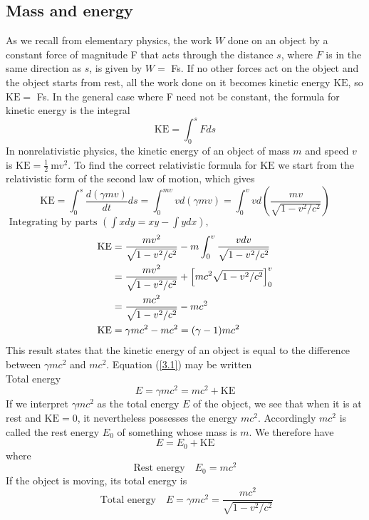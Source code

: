 \subsection{Mass and energy}
As we recall from elementary physics, the work $W$ done on an object by a constant force of magnitude F that acts through the distance $s$, where $F$ is in the same direction as $s$, is given by $W=$ Fs. If no other forces act on the object and the object starts from rest, all the work done on it becomes kinetic energy $\mathrm{KE}$, so $\mathrm{KE}=$ Fs. In the general case where F need not be constant, the formula for kinetic energy is the integral
$$
\mathrm{KE}=\int_{0}^{s} F d s
$$
In nonrelativistic physics, the kinetic energy of an object of mass $m$ and speed $v$ is $\mathrm{KE}=\frac{1}{2} \mathrm{~m} v^{2}$. To find the correct relativistic formula for $\mathrm{KE}$ we start from the relativistic form of the second law of motion, which gives
$$\mathrm{KE}=\int_{0}^{s} \frac{d(\gamma m v)}{d t} d s=\int_{0}^{m v} v d(\gamma m v)=\int_{0}^{v} v d\left(\frac{m v}{\sqrt{1-v^{2} / c^{2}}}\right)$$
$\text { Integrating by parts }\left(\int x d y=x y-\int y d x\right) \text {, }$
\begin{align}
	\mathrm{KE} &=\frac{m v^{2}}{\sqrt{1-v^{2} / c^{2}}}-m \int_{0}^{v} \frac{v d v}{\sqrt{1-v^{2} / c^{2}}} \notag \\
	&=\frac{m v^{2}}{\sqrt{1-v^{2} / c^{2}}}+\left[m c^{2} \sqrt{1-v^{2} / c^{2}}\right]_{0}^{v} \notag \\
	&=\frac{m c^{2}}{\sqrt{1-v^{2} / c^{2}}}-m c^{2}\notag\\
	\mathrm{KE}&=\gamma m c^{2}-m c^{2}=(\gamma-1) m c^{2} \label{3.1}
\end{align}
This result states that the kinetic energy of an object is equal to the difference between $\gamma m c^{2}$ and $m c^{2}$. Equation (\ref{3.1}) may be written\\
Total energy
$$
E=\gamma m c^{2}=m c^{2}+\mathrm{KE}
$$
If we interpret $\gamma m c^{2}$ as the total energy $E$ of the object, we see that when it is at rest and $\mathrm{KE}=0$, it nevertheless possesses the energy $m c^{2}$. Accordingly $m c^{2}$ is called the rest energy $E_{0}$ of something whose mass is $m$. We therefore have
$$
E=E_{0}+\mathrm{KE}
$$
 where   
 \begin{equation}
 \text{Rest energy} \quad
 E_{0}=m c^{2} \label{ref3.2}
 \end{equation}
 If the object is moving, its total energy is 
 \begin{equation}
\text{ Total energy} \quad
 E=\gamma m c^{2}=\frac{m c^{2}}{\sqrt{1-v^{2} / c^{2}}}
 \end{equation}
